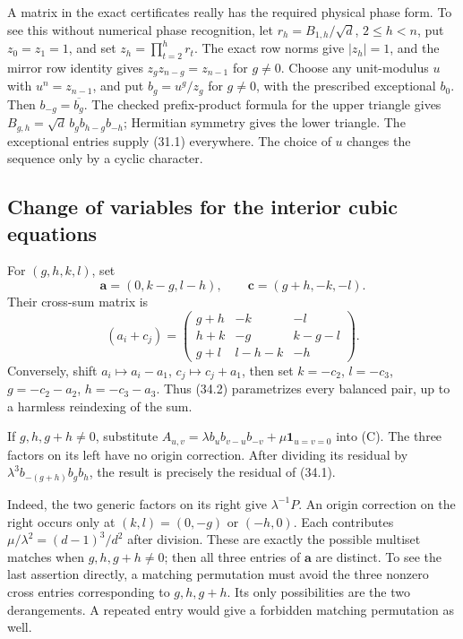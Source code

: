 \documentclass[11pt,reqno]{amsart}
\theoremstyle{plain}
\begin{document}
A matrix in the exact certificates really has the required physical
phase form. To see this without numerical phase recognition, let
\(r_h=B_{1,h}/\sqrt d\), \(2\le h<n\), put \(z_0=z_1=1\),
and set \(z_h=\prod_{t=2}^h r_t\). The exact row norms give
\(|z_h|=1\), and the mirror row identity gives
\(z_gz_{n-g}=z_{n-1}\) for \(g\ne0\). Choose any unit-modulus
\(u\) with \(u^n=z_{n-1}\), and put \(b_g=u^g/z_g\) for
\(g\ne0\), with the prescribed exceptional \(b_0\).
Then \(b_{-g}=\overline{b_g}\). The checked prefix-product formula
for the upper triangle gives
\(B_{g,h}=\sqrt d\,b_gb_{h-g}b_{-h}\); Hermitian symmetry gives
the lower triangle. The exceptional entries supply (31.1) everywhere.
The choice of \(u\) changes the sequence only by a cyclic character.

\subsection{Change of variables for the interior cubic equations}\label{sec:34.1}

For \((g,h,k,l)\), set
\begin{equation*}
 \mathbf a=(0,k-g,l-h),\qquad
 \mathbf c=(g+h,-k,-l). \tag{34.2}
\end{equation*}
Their cross-sum matrix is
\begin{equation*}
 (a_i+c_j)=
 \begin{pmatrix}
 g+h&-k&-l\\
 h+k&-g&k-g-l\\
 g+l&l-h-k&-h
 \end{pmatrix}. \tag{34.3}
\end{equation*}
Conversely, shift \(a_i\mapsto a_i-a_1\),
\(c_j\mapsto c_j+a_1\), then set
\(k=-c_2\), \(l=-c_3\), \(g=-c_2-a_2\),
\(h=-c_3-a_3\). Thus (34.2) parametrizes every balanced pair,
up to a harmless reindexing of the sum.

If \(g,h,g+h\ne0\), substitute
\(A_{u,v}=\lambda b_u b_{v-u}b_{-v}+\mu\mathbf1_{u=v=0}\)
into (C). The three factors on its left have no origin correction.
After dividing its residual by
\(\lambda^3b_{-(g+h)}b_gb_h\), the result is precisely the
residual of (34.1).

Indeed, the two generic factors on its right give
\(\lambda^{-1}P\). An origin correction on the right occurs
only at \((k,l)=(0,-g)\) or \((-h,0)\). Each contributes
\(\mu/\lambda^2=(d-1)^3/d^2\) after division. These are
exactly the possible multiset matches when \(g,h,g+h\ne0\);
then all three entries of \(\mathbf a\) are distinct. To see the
last assertion directly, a matching permutation must avoid the three
nonzero cross entries corresponding to \(g,h,g+h\). Its only
possibilities are the two derangements. A repeated entry would give
a forbidden matching permutation as well.
\end{document}
